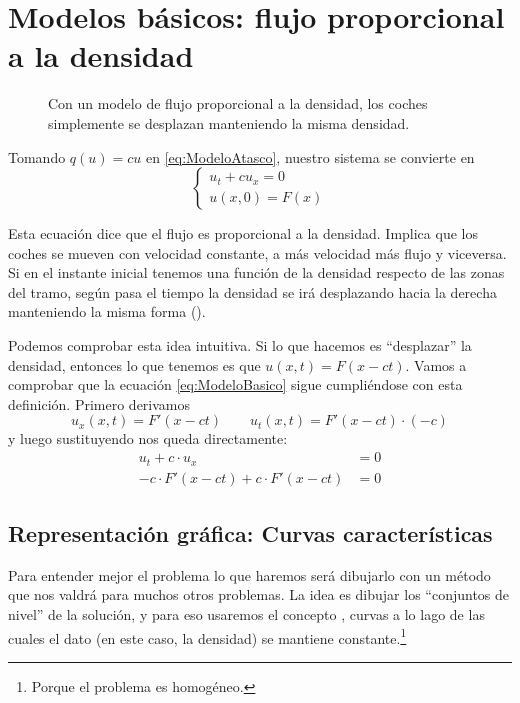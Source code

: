 	\section{Modelos básicos: flujo proporcional a la densidad}
	\label{sec:ModeloBasicoFlujoProporcional}

		\begin{figure}[hbtp]
		\centering
		\caption{Con un modelo de flujo proporcional a la densidad, los coches simplemente se desplazan manteniendo la misma densidad.}
		\label{fig:CochesModeloLineal}
		\end{figure}

		Tomando $q(u) = cu$ en \eqref{eq:ModeloAtasco}, nuestro sistema se convierte en
		\begin{equation}
		\left\{
		\begin{array}{l}
		u_t + cu_x = 0 \\
		u(x,0) = F(x)
		\end{array}
		\right. \label{eq:ModeloBasico}
		\end{equation}

		Esta ecuación dice que el flujo es proporcional a la densidad. Implica que los coches se mueven con velocidad constante, a más velocidad más flujo y viceversa. Si en el instante inicial tenemos una función de la densidad respecto de las zonas del tramo, según pasa el tiempo la densidad se irá desplazando hacia la derecha manteniendo la misma forma ().

		Podemos comprobar esta idea intuitiva. Si lo que hacemos es ``desplazar'' la densidad, entonces lo que tenemos es que $u(x,t) = F(x-ct)$. Vamos a comprobar que la ecuación \eqref{eq:ModeloBasico} sigue cumpliéndose con esta definición. Primero derivamos \[ u_x(x,t) = F'(x-ct) \qquad u_t(x,t) = F'(x-ct) · (-c) \] y luego sustituyendo nos queda directamente: \begin{align*}
			u_t + c·u_x &= 0 \\
			-c·F'(x-ct) + c·F'(x-ct) &= 0
		\end{align*}

		\subsection{Representación gráfica: Curvas características}

			Para entender mejor el problema lo que haremos será dibujarlo con un método que nos valdrá para muchos otros problemas. La idea es dibujar los ``conjuntos de nivel'' de la solución, y para eso usaremos el concepto , curvas a lo lago de las cuales el dato (en este caso, la densidad) se mantiene constante.\footnote{Porque el problema es homogéneo.}

